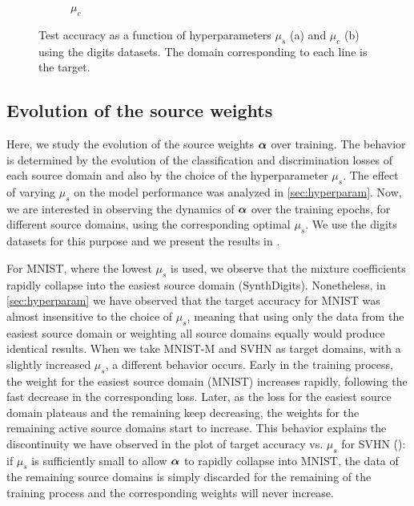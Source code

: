 \begin{figure}
\begin{subfigure}[b]{0.45\textwidth}
		\caption{$\mu_c$}
		\label{fig:hyperparam_mu_c}
	\end{subfigure}
	\caption{Test accuracy as a function of hyperparameters $\mu_s$ (a) and $\mu_c$ (b) using the digits datasets. The domain corresponding to each line is the target.}
	\label{fig:hyperparam}
\end{figure}

\subsection{Evolution of the source weights}
\label{sec:alpha_evol}
Here, we study the evolution of the source weights ${\bm{\alpha}}$ over training. The behavior is determined by the evolution of the classification and discrimination losses of each source domain and also by the choice of the hyperparameter $\mu_s$. The effect of varying $\mu_s$ on the model performance was analyzed in \ref{sec:hyperparam}. Now, we are interested in observing the dynamics of ${\bm{\alpha}}$ over the training epochs, for different source domains, using the corresponding optimal $\mu_s$. We use the digits datasets for this purpose and we present the results in .

For MNIST, where the lowest $\mu_s$ is used, we observe that the mixture coefficients rapidly collapse into the easiest source domain (SynthDigits). Nonetheless, in \ref{sec:hyperparam} we have observed that the target accuracy for MNIST was almost insensitive to the choice of $\mu_s$, meaning that using only the data from the easiest source domain or weighting all source domains equally would produce identical results. When we take MNIST-M and SVHN as target domains, with a slightly increased $\mu_s$, a different behavior occurs. Early in the training process, the weight for the easiest source domain (MNIST) increases rapidly, following the fast decrease in the corresponding loss. Later, as the loss for the easiest source domain plateaus and the remaining keep decreasing, the  weights for the remaining active source domains start to increase. This behavior explains the discontinuity we have observed in the plot of target accuracy vs. $\mu_s$ for SVHN (): if $\mu_s$ is sufficiently small to allow ${\bm{\alpha}}$ to rapidly collapse into MNIST, the data of the remaining source domains is simply discarded for the remaining of the training process and the corresponding weights will never increase.

